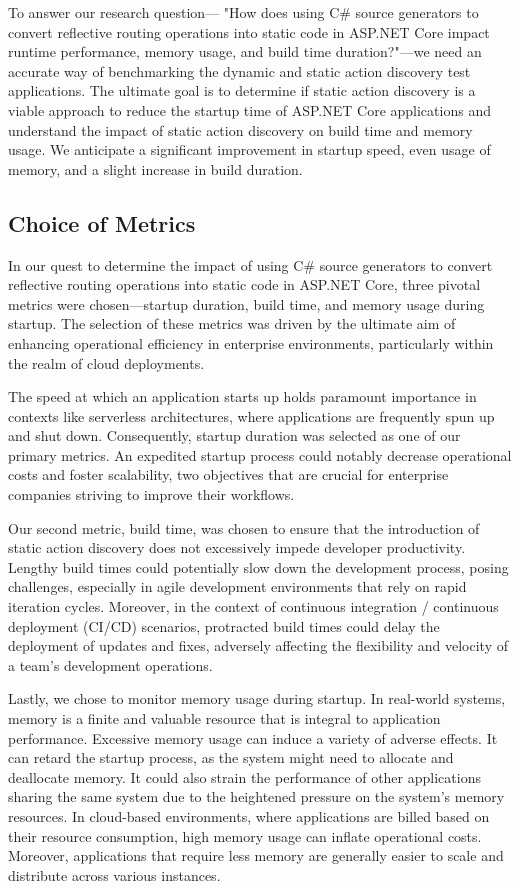 To answer our research question— "How does using C\# source generators to convert reflective routing operations into static code in ASP.NET Core impact runtime performance, memory usage, and build time duration?"—we need an accurate way of benchmarking the dynamic and static action discovery test applications. The ultimate goal is to determine if static action discovery is a viable approach to reduce the startup time of ASP.NET Core applications and understand the impact of static action discovery on build time and memory usage. We anticipate a significant improvement in startup speed, even usage of memory, and a slight increase in build duration.

\subsection{Choice of Metrics}

In our quest to determine the impact of using C\# source generators to convert reflective routing operations into static code in ASP.NET Core, three pivotal metrics were chosen—startup duration, build time, and memory usage during startup. The selection of these metrics was driven by the ultimate aim of enhancing operational efficiency in enterprise environments, particularly within the realm of cloud deployments.

The speed at which an application starts up holds paramount importance in contexts like serverless architectures, where applications are frequently spun up and shut down. Consequently, startup duration was selected as one of our primary metrics. An expedited startup process could notably decrease operational costs and foster scalability, two objectives that are crucial for enterprise companies striving to improve their workflows.

Our second metric, build time, was chosen to ensure that the introduction of static action discovery does not excessively impede developer productivity. Lengthy build times could potentially slow down the development process, posing challenges, especially in agile development environments that rely on rapid iteration cycles. Moreover, in the context of continuous integration / continuous deployment (CI/CD) scenarios, protracted build times could delay the deployment of updates and fixes, adversely affecting the flexibility and velocity of a team's development operations.

Lastly, we chose to monitor memory usage during startup. In real-world systems, memory is a finite and valuable resource that is integral to application performance. Excessive memory usage can induce a variety of adverse effects. It can retard the startup process, as the system might need to allocate and deallocate memory. It could also strain the performance of other applications sharing the same system due to the heightened pressure on the system's memory resources. In cloud-based environments, where applications are billed based on their resource consumption, high memory usage can inflate operational costs. Moreover, applications that require less memory are generally easier to scale and distribute across various instances.

